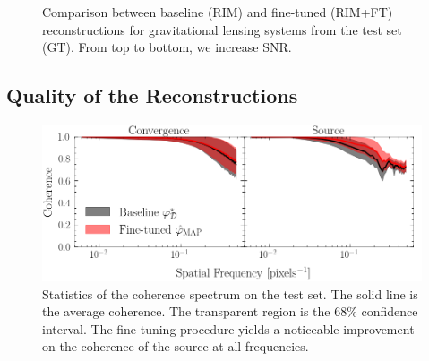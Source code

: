 \begin{figure}[H]
        \centering
        \caption{
        Comparison between baseline (RIM) and fine-tuned (RIM+FT) reconstructions for gravitational lensing systems from the test set (GT).
        From top to bottom, we increase SNR. 
        }
        \label{fig:increasing SNR}
\end{figure}

\subsection{Quality of the Reconstructions}\label{sec:quality of reconstructions}

\begin{figure}[H]
        \centering
        \includegraphics[width=0.8\linewidth]{figures/coherence_spectrum}
        \caption{Statistics of the coherence spectrum on the test set. The solid line is the average 
        coherence. The transparent region is the $68\%$ confidence interval. The fine-tuning 
        procedure yields a noticeable improvement on the coherence of the source at all frequencies.}
        \label{fig:coherence}
\end{figure}


